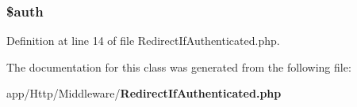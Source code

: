 \subsubsection[{\$auth}]{\setlength{\rightskip}{0pt plus 5cm}\$auth\hspace{0.3cm}{\ttfamily [protected]}}\label{class_app_1_1_http_1_1_middleware_1_1_redirect_if_authenticated_a20d7415a9c3391b32d7fe2136fce6e2c}


Definition at line 14 of file Redirect\+If\+Authenticated.\+php.



The documentation for this class was generated from the following file\+:\begin{DoxyCompactItemize}
\item 
app/\+Http/\+Middleware/{\bf Redirect\+If\+Authenticated.\+php}\end{DoxyCompactItemize}

